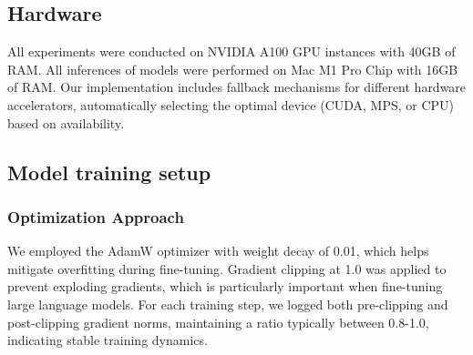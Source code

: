 \documentclass{article}
\begin{document}
\subsection*{Hardware}
All experiments were conducted on NVIDIA A100 GPU instances with 40GB of RAM. All inferences of models were performed on Mac M1 Pro Chip with 16GB of RAM. 
Our implementation includes fallback mechanisms for different hardware accelerators, automatically selecting the optimal device (CUDA, MPS, or CPU) based on availability.

\subsection*{Model training setup}
\subsubsection*{Optimization Approach}

We employed the AdamW optimizer with weight decay of 0.01, which helps mitigate overfitting during fine-tuning. Gradient clipping at 1.0 was applied to prevent exploding gradients, which is particularly important when fine-tuning large language models. For each training step, we logged both pre-clipping and post-clipping gradient norms, maintaining a ratio typically between 0.8-1.0, indicating stable training dynamics.
\end{document}
